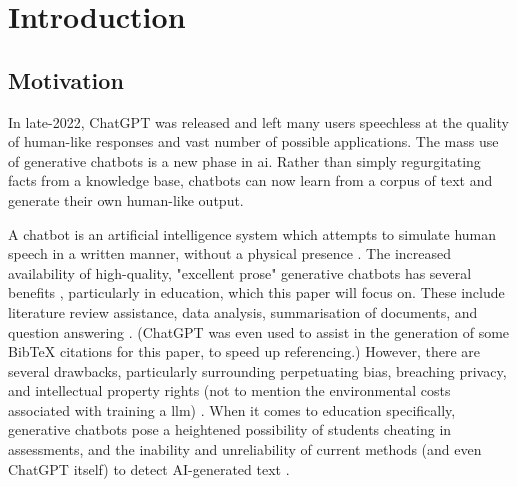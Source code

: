 \chapter{Introduction}




\section{Motivation} %
\label{sec:intro_motivation}

In late-2022, ChatGPT was released and left many users speechless at the quality of human-like responses and vast number of possible applications. The mass use of generative chatbots is a new phase in \acrfull{ai}. Rather than simply regurgitating facts from a knowledge base, chatbots can now learn from a corpus of text and generate their own human-like output.

A chatbot is an artificial intelligence system which attempts to simulate human speech in a written manner, without a physical presence \citep{Nee2023ExploringTT}. The increased availability of high-quality, "excellent prose" generative chatbots has several benefits \citep{Floridi}, particularly in education, which this paper will focus on. These include literature review assistance, data analysis, summarisation of documents, and question answering \citep{lund2023chatting}. (ChatGPT was even used to assist in the generation of some BibTeX citations for this paper, to speed up referencing.) However, there are several drawbacks, particularly surrounding perpetuating bias, breaching privacy, and intellectual property rights (not to mention the environmental costs associated with training a \acrfull{llm}) \citep{Jungherr, Bender21}. When it comes to education specifically, generative chatbots pose a heightened possibility of students cheating in assessments, and the inability and unreliability of current methods (and even ChatGPT itself) to detect AI-generated text \citep{susnjak2022, Cotton}.

